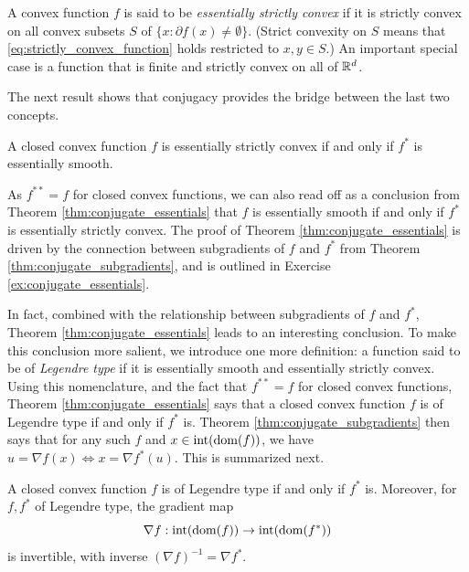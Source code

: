 A convex function $f$ is said to be
\emph{essentially strictly convex} if it is strictly convex on all convex
subsets $S$ of $ \{x : \partial f(x) \not= \emptyset\}$. (Strict convexity on
$S$ means that \eqref{eq:strictly_convex_function} holds restricted to $x,y \in
S$.) An important special case is a function that is finite and strictly convex
on all of $\mathbb{R}^d$.   

The next result shows that conjugacy provides the bridge between the last two
concepts.  

\begin{Theorem}
\label{thm:conjugate_essentials}
A closed convex function $f$ is essentially strictly convex if and only if $f^*$
is essentially smooth. 
\end{Theorem}


As $f^{**} = f$ for closed convex functions, we can also read off as a
conclusion from Theorem \ref{thm:conjugate_essentials} that $f$ is essentially
smooth if and only if $f^*$ is essentially strictly convex. The proof of Theorem 
\ref{thm:conjugate_essentials} is driven by the connection between subgradients
of $f$ and $f^*$ from Theorem \ref{thm:conjugate_subgradients}, and is outlined
in Exercise \ref{ex:conjugate_essentials}.

In fact, combined with the relationship between subgradients of $f$ and $f^*$,
Theorem \ref{thm:conjugate_essentials} leads to an interesting conclusion. To
make this conclusion more salient, we introduce one more definition: a function
said to be of \emph{Legendre type} if it is essentially smooth and essentially
strictly convex. Using this nomenclature, and the fact that $f^{**} = f$ for
closed convex functions, Theorem \ref{thm:conjugate_essentials} says that a
closed convex function $f$ is of Legendre type if and only if $f^*$ is. Theorem
\ref{thm:conjugate_subgradients} then says that for any such $f$ and $x \in
\operatorname{int}(\operatorname{dom}(f))$, we have $u = \nabla f(x) \iff x = \nabla f^*(u)$. This is   
summarized next. 

\begin{Theorem}
\label{thm:conjugate_legendre}
A closed convex function $f$ is of Legendre type if and only if $f^*$
is. Moreover, for $f,f^*$ of Legendre type, the gradient map
\[
\nabla f : \operatorname{int}(\operatorname{dom}(f)) \to \operatorname{int}(\operatorname{dom}(f^*))
\]
is invertible, with inverse $(\nabla f)^{-1} = \nabla f^*$. 
\end{Theorem}

